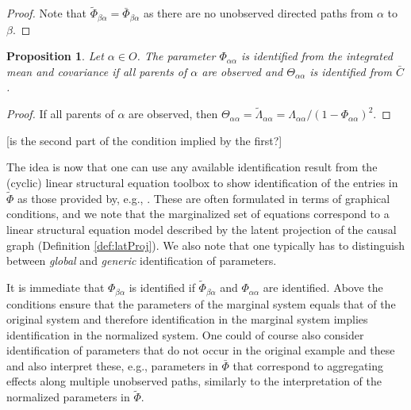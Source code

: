 \documentclass[accepted]{uai2021} %
\newtheorem{prop}[thm]{Proposition}
\begin{document}
\begin{proof}
	Note that $\tilde{\Phi}_{\beta\alpha} = \bar{\Phi}_{\beta\alpha}$ as there 
	are no 
	unobserved directed paths from $\alpha$ to $\beta$.
\end{proof}

\begin{prop}
	Let $\alpha\in O$. The parameter $\Phi_{\alpha\alpha}$ is identified from 
	the 
	integrated mean and covariance if all 
	parents of $\alpha$ are observed and $\Theta_{\alpha\alpha}$ is identified 
	from 
	$\bar{C}$.
\end{prop}

\begin{proof}
	If all parents of $\alpha$ are observed, then $\Theta_{\alpha\alpha} = 
	\tilde{\Lambda}_{\alpha\alpha} = \Lambda_{\alpha\alpha}/(1 - 
	\Phi_{\alpha\alpha})^2$.
\end{proof}

[is the second part of the condition implied by the first?]

The idea is now 
that one can use any available identification result from the (cyclic) linear 
structural equation toolbox to show identification of the entries in 
$\tilde{\Phi}$ as those provided by, e.g., \cite{foygelHalftrek2012, 
chenNIPS2016, 
weihs2018}. 
These are often 
formulated in terms of graphical 
conditions, and we note that the 
marginalized set of equations correspond to a linear structural 
equation model described by the latent projection of the causal graph 
(Definition \ref{def:latProj}). We also note that one typically has to 
distinguish between \emph{global} and \emph{generic} identification of 
parameters.


It is immediate that $\Phi_{\beta\alpha}$ is identified if 
$\tilde{\Phi}_{\beta\alpha}$ and $\Phi_{\alpha\alpha}$ are identified. Above 
the 
conditions ensure that the parameters of the marginal system equals that of the 
original system and therefore identification in the marginal system implies 
identification in the normalized system. One could of course also consider 
identification of parameters that do not occur in the original example and 
these and also interpret these, e.g., parameters in $\bar{\Phi}$ that 
correspond to aggregating effects along multiple unobserved paths, similarly to 
the 
interpretation of the normalized parameters in $\tilde{\Phi}$.
\end{document}
